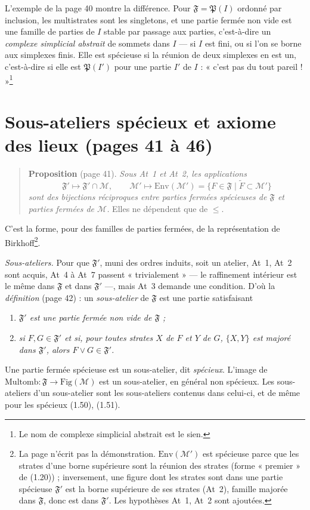 \documentclass[11pt,a4paper]{article}
\begin{document}
L'exemple de la page 40 montre la différence. Pour $\mathfrak{F} =
\mathfrak{P}(I)$ ordonné par inclusion, les multistrates sont les singletons, et
une partie fermée non vide est une famille de parties de $I$ stable par passage
aux parties, c'est-à-dire un \emph{complexe simplicial abstrait} de sommets dans
$I$ --- si $I$ est fini, ou si l'on se borne aux simplexes finis. Elle est
spécieuse si la réunion de deux simplexes en est un, c'est-à-dire si elle est
$\mathfrak{P}(I')$ pour une partie $I'$ de $I$ : « c'est pas du tout
pareil ! »\footnote{Le nom de complexe simplicial abstrait est le sien.}

\section*{Sous-ateliers spécieux et axiome des lieux (pages 41 à 46)}

\begin{quote}
\textbf{Proposition} (page 41). \emph{Sous At~1 et At~2, les applications
\[
\mathfrak{F}' \longmapsto \mathfrak{F}' \cap \mathcal{M}, \qquad \mathcal{M}'
\longmapsto \mathrm{Env}(\mathcal{M}') = \lbrace F \in \mathfrak{F} \mid
\widetilde{F} \subset \mathcal{M}' \rbrace
\]
sont des bijections réciproques entre parties fermées spécieuses de
$\mathfrak{F}$ et parties fermées de $\mathcal{M}$.} Elles ne dépendent que de
$\leq$.
\end{quote}

C'est la forme, pour des familles de parties fermées, de la représentation de
Birkhoff\footnote{La page n'écrit pas la démonstration. $\mathrm{Env}(\mathcal{M}')$
est spécieuse parce que les strates d'une borne supérieure sont la réunion des
strates (forme « premier » de (1.20)) ; inversement, une figure dont les strates
sont dans une partie spécieuse $\mathfrak{F}'$ est la borne supérieure de ses
strates (At~2), famille majorée dans $\mathfrak{F}$, donc est dans
$\mathfrak{F}'$. Les hypothèses At~1, At~2 sont ajoutées.}.

\emph{Sous-ateliers.} Pour que $\mathfrak{F}'$, muni des ordres induits, soit un
atelier, At~1, At~2 sont acquis, At~4 à At~7 passent « trivialement » --- le
raffinement intérieur est le même dans $\mathfrak{F}$ et dans $\mathfrak{F}'$ ---,
mais At~3 demande une condition. D'où la \emph{définition} (page 42) : un
\emph{sous-atelier} de $\mathfrak{F}$ est une partie satisfaisant
\begin{enumerate}
\item[Sousat~1] \emph{$\mathfrak{F}'$ est une partie fermée non vide de
$\mathfrak{F}$ ;}
\item[Sousat~2] \emph{si $F, G \in \mathfrak{F}'$ et si, pour toutes strates $X$
de $F$ et $Y$ de $G$, $\lbrace X, Y \rbrace$ est majoré dans $\mathfrak{F}'$,
alors $F \vee G \in \mathfrak{F}'$.}
\end{enumerate}
Une partie fermée spécieuse est un sous-atelier, dit \emph{spécieux}. L'image de
$\mathrm{Multomb} : \mathfrak{F} \to \mathrm{Fig}(\mathcal{M})$ est un
sous-atelier, en général non spécieux. Les sous-ateliers d'un sous-atelier sont
les sous-ateliers contenus dans celui-ci, et de même pour les spécieux (1.50),
(1.51).
\end{document}
